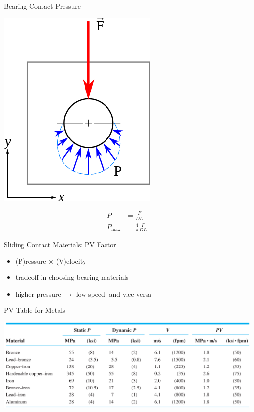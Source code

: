 \documentclass[10pt, svgnames]{beamer}
\begin{document}
\begin{frame}[label={sec:org70154c5}]{Bearing Contact Pressure}
\begin{center}
\includegraphics[height=0.6\textheight]{./pictures/elastic-cyl-on-cyl-pressure.png}
\end{center}

\begin{align*}
    P &= \frac{F}{DL} \\
    P_{\max} &= \frac{4}{\pi} \frac{F}{DL}
 \end{align*}
\end{frame}

\begin{frame}[label={sec:org8cb7d79}]{Sliding Contact Materials: PV Factor}
\begin{itemize}
\item (P)ressure \(\times\) (V)elocity
\item tradeoff in choosing bearing materials
\item higher pressure \(\rightarrow\) low speed, and vice versa
\end{itemize}
\end{frame}

\begin{frame}[label={sec:org4e9be24}]{PV Table for Metals}
\begin{center}
\includegraphics[width=\textwidth]{./pictures/pv-metal.png}
\end{center}
\end{frame}
\end{document}
